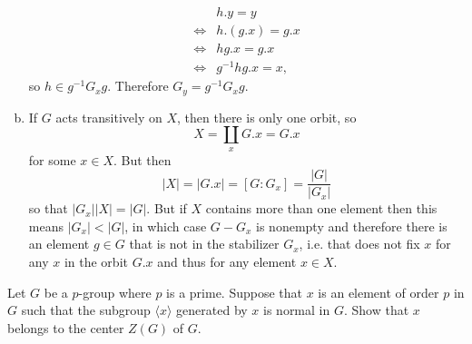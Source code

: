 \documentclass{article}
\newcounter{Problem}
\newenvironment{Problem}{\begin{Exercise}[name={Problem},
                                          counter={Problem}]}
                        {\end{Exercise}}
\begin{document}
\begin{Answer}
\begin{enumerate}[(a)]
{      \begin{align*}
           & h . y = y \\
      \iff & h . (g . x) = g . x \\
      \iff & h g . x = g . x \\
      \iff & g^{-1} h g . x = x,
      \end{align*}
      so $h \in g^{-1} G_x g$. Therefore $G_y = g^{-1} G_x g$.
    }
    \item{
      If $G$ acts transitively on $X$, then there is only one orbit,
      so 
      $$
      X = \coprod_x G . x = G . x
      $$
      for some $x \in X$. But then
      $$
      |X| = |G . x| = [G : G_x] = \frac{|G|}{|G_x|}
      $$
      so that $|G_x| |X| = |G|$. But if $X$ contains more than one
      element then this means $|G_x| < |G|$, in which case
      $G - G_x$ is nonempty and therefore there is an element
      $g \in G$ that is not in the stabilizer $G_x$, i.e. that does
      not fix $x$ for any $x$ in the orbit $G . x$ and thus for any
      element $x \in X$.
    }
  \end{enumerate}
\end{Answer}

\pagebreak
\begin{Problem}
Let $G$ be a $p$-group where $p$ is a prime. Suppose that $x$ is an
element of order $p$ in $G$ such that the subgroup $\langle x \rangle$
generated by $x$ is normal in $G$. Show that $x$ belongs to the center
$Z(G)$ of $G$.
\end{Problem}
\end{document}
